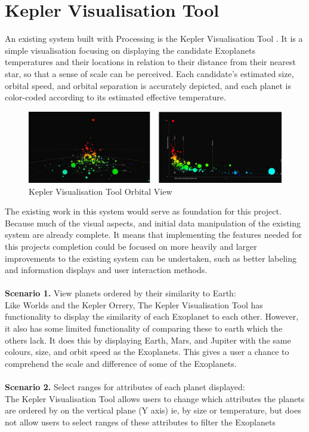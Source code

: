 \section{Kepler Visualisation Tool}
An existing system built with Processing is the Kepler Visualisation
Tool \cite{kepler_github, kepler_article}. It is a simple visualisation focusing
on displaying the candidate Exoplanets temperatures and their locations in
relation to their distance from their nearest star, so that a sense of scale can
be perceived. Each candidate’s estimated size, orbital speed, and orbital
separation is accurately depicted, and each planet is color-coded according to
its estimated effective temperature.
\begin{figure}[H]
  \centering
      \includegraphics[width=1\textwidth]{images/kepler.jpg}
  \caption{Kepler Visualisation Tool Orbital View}
\end{figure}

The existing work in this system would serve as foundation for this project.
Because much of the visual aspects, and initial data manipulation of the
existing system are already complete. It means that implementing the features
needed for this projects completion could be focused on more heavily and larger
improvements to the existing system can be undertaken, such as better labeling
and information displays and user interaction methods.
\\\\
{\bf Scenario 1.} View planets ordered by their similarity to Earth:\\
Like Worlds and the Kepler Orrery, The Kepler Visualisation Tool has
functionality to display the similarity of each Exoplanet to each other.
However, it also has some limited functionality of comparing these to earth
which the others lack. It does this by displaying Earth, Mars, and Jupiter with
the same colours, size, and orbit speed as the Exoplanets. This gives a user a
chance to comprehend the scale and difference of some of the Exoplanets.
\\\\
{\bf Scenario 2.} Select ranges for attributes of each planet displayed:\\
The Kepler Visualisation Tool allows users to change which attributes the
planets are ordered by on the vertical plane (Y axis) ie, by size or
temperature, but does not allow users to select ranges of these attributes to
filter the Exoplanets

